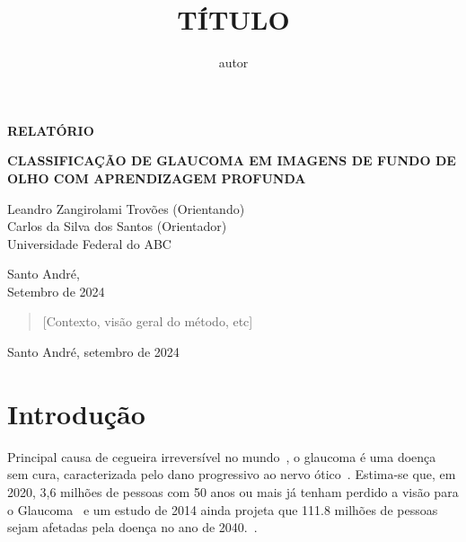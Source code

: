 \documentclass[12pt]{article}
\title{TÍTULO}
\author{autor}
\begin{document}
\thispagestyle{empty}

    
    \begin{flushright}
        \begin{huge}
            \textbf{RELATÓRIO}\\[3,5cm]
        \end{huge}
{\bf \LARGE  CLASSIFICAÇÃO DE GLAUCOMA EM IMAGENS DE FUNDO DE OLHO COM APRENDIZAGEM PROFUNDA}

\bigskip
        
        Leandro Zangirolami Trovões (Orientando)\\
        Carlos da Silva dos Santos (Orientador)\\
        Universidade Federal do ABC\\[5,5cm]
    \end{flushright}

    \vfill
    
    \begin{center}
        Santo André,\\
        Setembro de 2024
    \end{center}
    
    \newpage
\bigskip

\begin{center}
\end{center}

\begin{quote}
[Contexto, visão geral do método, etc]
\end{quote}

\begin{center}
Santo André, setembro de 2024
\end{center}

\newpage
\bigskip

\section{Introdução}
\label{sec:introducao}

Principal causa de cegueira irreversível no mundo~\cite{steinmetz_causes_2021}, o glaucoma é uma doença sem cura, caracterizada pelo dano progressivo ao nervo ótico~\cite{who_2019}. Estima-se que, em 2020, 3,6 milhões de pessoas com 50 anos ou mais já tenham perdido a visão para o Glaucoma~\cite{steinmetz_causes_2021} e um estudo de 2014 ainda projeta que 111.8 milhões de pessoas sejam afetadas pela doença no ano de 2040.~\cite{tham_global_2014}.
\end{document}

